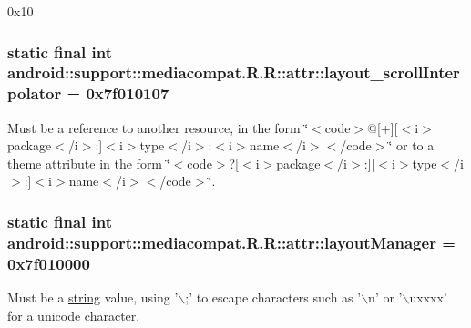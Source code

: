 0x10\hypertarget{classandroid_1_1support_1_1mediacompat_1_1_r_1_1attr_1ff8cb20162c6bf645ffc7274f80a710}{
\subsubsection[{layout\_\-scrollInterpolator}]{\setlength{\rightskip}{0pt plus 5cm}static final int android::support::mediacompat.R.R::attr::layout\_\-scrollInterpolator = 0x7f010107}}
\label{classandroid_1_1support_1_1mediacompat_1_1_r_1_1attr_1ff8cb20162c6bf645ffc7274f80a710}


Must be a reference to another resource, in the form \char`\"{}$<$code$>$@\mbox{[}+\mbox{]}\mbox{[}$<$i$>$package$<$/i$>$:\mbox{]}$<$i$>$type$<$/i$>$:$<$i$>$name$<$/i$>$$<$/code$>$\char`\"{} or to a theme attribute in the form \char`\"{}$<$code$>$?\mbox{[}$<$i$>$package$<$/i$>$:\mbox{]}\mbox{[}$<$i$>$type$<$/i$>$:\mbox{]}$<$i$>$name$<$/i$>$$<$/code$>$\char`\"{}. \hypertarget{classandroid_1_1support_1_1mediacompat_1_1_r_1_1attr_9c1de1528a93f4b727706b93b27c436a}{
\subsubsection[{layoutManager}]{\setlength{\rightskip}{0pt plus 5cm}static final int android::support::mediacompat.R.R::attr::layoutManager = 0x7f010000}}
\label{classandroid_1_1support_1_1mediacompat_1_1_r_1_1attr_9c1de1528a93f4b727706b93b27c436a}


Must be a \hyperlink{classandroid_1_1support_1_1mediacompat_1_1_r_1_1string}{string} value, using '$\backslash$;' to escape characters such as '$\backslash$n' or '$\backslash$uxxxx' for a unicode character. 

